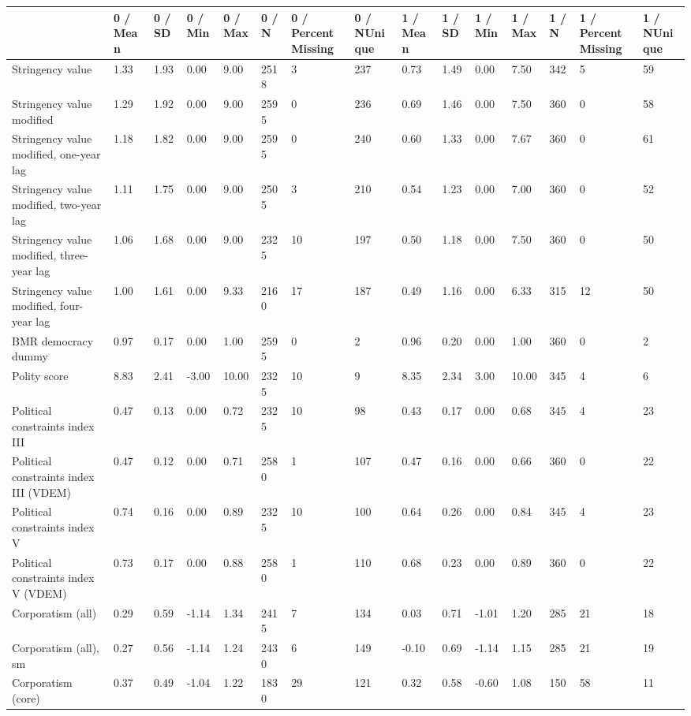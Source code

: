 
\begin{longtable}{lllllllllllllll}
\toprule
  & 0 / Mean & 0 / SD & 0 / Min & 0 / Max & 0 / N & 0 / PercentMissing & 0 / NUnique & 1 / Mean & 1 / SD & 1 / Min & 1 / Max & 1 / N & 1 / PercentMissing & 1 / NUnique\\
\midrule
Stringency value & 1.33 & 1.93 & 0.00 & 9.00 & 2518 & 3 & 237 & 0.73 & 1.49 & 0.00 & 7.50 & 342 & 5 & 59\\
Stringency value modified & 1.29 & 1.92 & 0.00 & 9.00 & 2595 & 0 & 236 & 0.69 & 1.46 & 0.00 & 7.50 & 360 & 0 & 58\\
Stringency value modified, one-year lag & 1.18 & 1.82 & 0.00 & 9.00 & 2595 & 0 & 240 & 0.60 & 1.33 & 0.00 & 7.67 & 360 & 0 & 61\\
Stringency value modified, two-year lag & 1.11 & 1.75 & 0.00 & 9.00 & 2505 & 3 & 210 & 0.54 & 1.23 & 0.00 & 7.00 & 360 & 0 & 52\\
Stringency value modified, three-year lag & 1.06 & 1.68 & 0.00 & 9.00 & 2325 & 10 & 197 & 0.50 & 1.18 & 0.00 & 7.50 & 360 & 0 & 50\\
\addlinespace
Stringency value modified, four-year lag & 1.00 & 1.61 & 0.00 & 9.33 & 2160 & 17 & 187 & 0.49 & 1.16 & 0.00 & 6.33 & 315 & 12 & 50\\
BMR democracy dummy & 0.97 & 0.17 & 0.00 & 1.00 & 2595 & 0 & 2 & 0.96 & 0.20 & 0.00 & 1.00 & 360 & 0 & 2\\
Polity score & 8.83 & 2.41 & -3.00 & 10.00 & 2325 & 10 & 9 & 8.35 & 2.34 & 3.00 & 10.00 & 345 & 4 & 6\\
Political constraints index III & 0.47 & 0.13 & 0.00 & 0.72 & 2325 & 10 & 98 & 0.43 & 0.17 & 0.00 & 0.68 & 345 & 4 & 23\\
Political constraints index III (VDEM) & 0.47 & 0.12 & 0.00 & 0.71 & 2580 & 1 & 107 & 0.47 & 0.16 & 0.00 & 0.66 & 360 & 0 & 22\\
\addlinespace
Political constraints index V & 0.74 & 0.16 & 0.00 & 0.89 & 2325 & 10 & 100 & 0.64 & 0.26 & 0.00 & 0.84 & 345 & 4 & 23\\
Political constraints index V (VDEM) & 0.73 & 0.17 & 0.00 & 0.88 & 2580 & 1 & 110 & 0.68 & 0.23 & 0.00 & 0.89 & 360 & 0 & 22\\
Corporatism (all) & 0.29 & 0.59 & -1.14 & 1.34 & 2415 & 7 & 134 & 0.03 & 0.71 & -1.01 & 1.20 & 285 & 21 & 18\\
Corporatism (all), sm & 0.27 & 0.56 & -1.14 & 1.24 & 2430 & 6 & 149 & -0.10 & 0.69 & -1.14 & 1.15 & 285 & 21 & 19\\
Corporatism (core) & 0.37 & 0.49 & -1.04 & 1.22 & 1830 & 29 & 121 & 0.32 & 0.58 & -0.60 & 1.08 & 150 & 58 & 11\\

\end{longtable}
